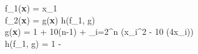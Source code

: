f_1(\textbf{x}) = x_1 \\
f_2(\textbf{x}) = g(\textbf{x}) h(f_1, g) \\
g(\textbf{x}) = 1 + 10(n-1) + \sum_{i=2}^{n} (x_i^2 - 10 \cos(4\pi x_i)) \\
h(f_1, g) = 1 - 
